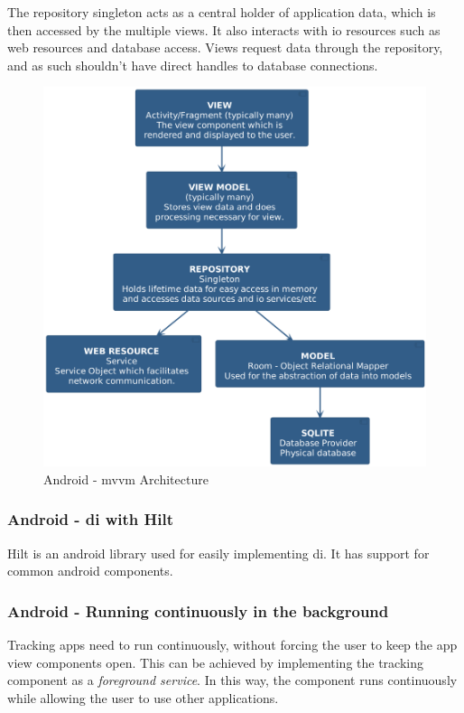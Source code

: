 The repository singleton acts as a central holder of application data, which is then accessed by the multiple views. It also interacts with \ac{io} resources such as web resources and database access. Views request data through the repository, and as such shouldn't have direct handles to database connections. \cite{noauthor_guide_nodate}

\begin{figure}
\centering
\includegraphics[scale=0.4]{../diag/mvvm_layout.png}
\caption{Android - \Ac{mvvm} Architecture}
\label{fig:mvvm_layout}
\end{figure}

\subsubsection{Android - \ac{di} with Hilt}
Hilt is an android library used for easily implementing \ac{di}.
It has support for common android components.
\cite{noauthor_dependency_nodate}

\subsubsection{Android - Running continuously in the background}
Tracking \ac{app}s need to run continuously, without forcing the user to keep the \ac{app} view components open.
This can be achieved by implementing the tracking component as a \textit{foreground service}.
In this way, the component runs continuously while allowing the user to use other applications.

